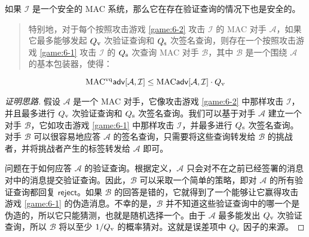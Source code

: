 \begin{theorem}\label{theo:6-1}
如果 $\mathcal{I}$ 是一个安全的 MAC 系统，那么它在存在验证查询的情况下也是安全的。
\begin{quote}
特别地，对于每个按照攻击游戏 \ref{game:6-2} 攻击 $\mathcal{I}$ 的 MAC 对手 $\mathcal{A}$，如果它最多能够发起 $Q_{\rm v}$ 次验证查询和 $Q_{\rm s}$ 次签名查询，则存在一个按照攻击游戏 \ref{game:6-1} 攻击 $\mathcal{I}$ 的 $Q_{\rm s}$ 次查询 MAC 对手 $\mathcal{B}$，其中 $\mathcal{B}$ 是一个围绕 $\mathcal{A}$ 的基本包装器，使得：
\end{quote}
\[
{\rm MAC^{vq}}\mathsf{adv}[\mathcal{A},\mathcal{I}]\leq{\rm MAC}\mathsf{adv}[\mathcal{A},\mathcal{I}]\cdot Q_{\rm v}
\]
\end{theorem}

\begin{proof}[证明思路]
假设 $\mathcal{A}$ 是一个 MAC 对手，它像攻击游戏 \ref{game:6-2} 中那样攻击 $\mathcal{I}$，并且最多进行 $Q_{\rm v}$ 次验证查询和 $Q_{\rm s}$ 次签名查询。我们可以基于对手 $\mathcal{A}$ 建立一个对手 $\mathcal{B}$，它如攻击游戏 \ref{game:6-1} 中那样攻击 $\mathcal{I}$，并最多进行 $Q_{\rm s}$ 次签名查询。对手 $\mathcal{B}$ 可以很容易地应答 $\mathcal{A}$ 的签名查询，只需要将这些查询转发给 $\mathcal{B}$ 的挑战者，并将挑战者产生的标签转发给 $\mathcal{A}$ 即可。

问题在于如何应答 $\mathcal{A}$ 的验证查询。根据定义，$\mathcal{A}$ 只会对不在之前已经签署的消息对中的消息提交验证查询。因此，$\mathcal{B}$ 可以采取一个简单的策略，即对 $\mathcal{A}$ 的所有验证查询都回复 $\mathsf{reject}$。如果 $\mathcal{B}$ 的回答是错的，它就得到了一个能够让它赢得攻击游戏 \ref{game:6-1} 的伪造消息。不幸的是，$\mathcal{B}$ 并不知道这些验证查询中的哪一个是伪造的，所以它只能猜测，也就是随机选择一个。由于 $\mathcal{A}$ 最多能发出 $Q_{\rm v}$ 次验证查询，所以 $\mathcal{B}$ 将以至少 ${1}/{Q_{\rm v}}$ 的概率猜对。这就是误差项中 $Q_{\rm v}$ 因子的来源。
\end{proof}

